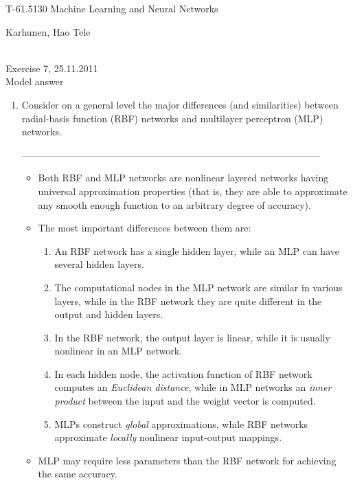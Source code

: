 \documentclass[10pt]{article}
\begin{document}
\pagestyle{empty}
\begin{Large}
\begin{bf} 
T-61.5130 Machine Learning and Neural Networks\\ 
\end{bf}
\end{Large}
Karhunen, Hao Tele\\  
\\
\begin{large}
\begin{bf}
Exercise 7,  25.11.2011\\Model answer
\end{bf}
\end{large}
\begin{enumerate}

\item Consider on a general level the major differences (and similarities)
  between radial-basis function (RBF) networks and multilayer perceptron
  (MLP) networks.

---------------------------------------------------------------------------------------------

\begin{itemize}
\item Both RBF and MLP networks are nonlinear layered networks having
universal approximation properties (that is, they are able to
approximate any smooth enough function to an arbitrary degree of accuracy).
\item The most important differences between them are:
%
\begin{enumerate}
\item An RBF network has a single hidden layer, while an MLP can have
several hidden layers.
\item The computational nodes in the MLP network are similar in various layers,
while in the RBF network they are quite different in the output
and hidden layers.
\item In the RBF network, the output layer is linear, while it is usually
nonlinear in an MLP network.
\item In each hidden node, the activation function of RBF network computes
an {\em Euclidean distance}, while in MLP networks an {\em inner product}
between the input and the weight vector is computed.
\item MLPs construct {\em global} approximations, while RBF networks
approximate {\em locally} nonlinear input-output mappings.
\end{enumerate}
%
\item MLP may require less parameters than the RBF network for achieving
the same accuracy.
\end{itemize}




\end{enumerate}
\end{document}
